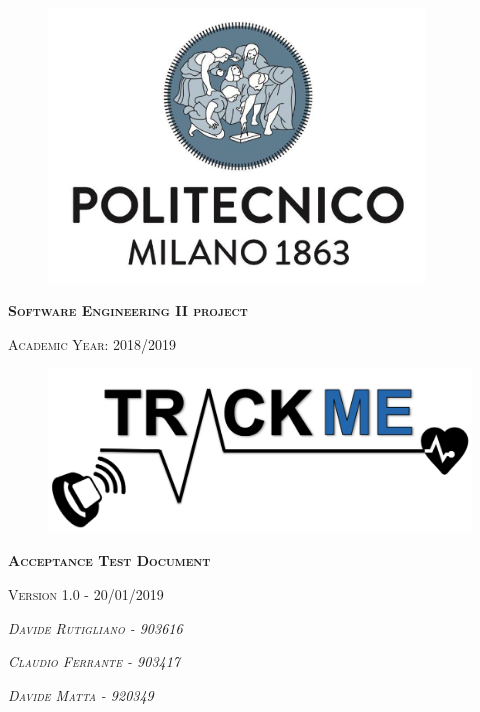 \thispagestyle{empty}
\begin{figure}[!h]
	\centering
	\includegraphics[width=100mm]{Images/poli-logo.png}
\end{figure}
\hfill
\begin{center}
    \fontsize{18px}{6mm}\selectfont \textsc{\textbf{Software Engineering II project}}
\end{center}
\begin{center}
    \fontsize{12px}{4mm}\selectfont \textsc{Academic Year: 2018/2019}
\end{center}
\hfill
\hfill
\begin{figure}[!h]
	\centering
	\includegraphics[width=120mm]{Images/trackme-logo.png}
\end{figure}
\hfill
\hfill
\begin{center}
    \fontsize{22px}{8mm}\selectfont \textsc{\textbf{Acceptance Test Document}}
\end{center}
\begin{center}
    \fontsize{14px}{4mm}\selectfont \textsc{{Version 1.0 - 20/01/2019}}
\end{center}
\hfill
\hfill
\begin{center}
\fontsize{14px}{4mm}\selectfont \textsc{\textit{Davide Rutigliano -  903616}}
\end{center}

\begin{center}
\fontsize{14px}{4mm}\selectfont \textsc{\textit{Claudio Ferrante - 903417\\}}
\end{center}

\begin{center}
\fontsize{14px}{4mm}\selectfont \textsc{\textit{Davide Matta - 920349}}
\end{center}